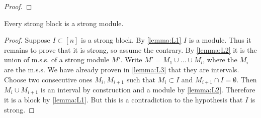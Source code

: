 \documentclass{amsart}
\makeatletter
\theoremstyle{plain}
{
	\newtheorem{{lemma}}{{Lemma}}[section]
	\labelformat{{lemma}}{{Lemma}##}
}
{
	\newtheorem{{theorem}}{{Theorem}}[section]
	\labelformat{{theorem}}{{Theorem}##}
}
{	\@namedef{c@{theorem}}{\@nameuse{c@{lemma}}}}
{
	\newtheorem{{corollary}}{{Corollary}}[section]
	\labelformat{{corollary}}{{Corollary}##}
}
{	\@namedef{c@{corollary}}{\@nameuse{c@{lemma}}}}
{
	\newtheorem{{proposition}}{{Proposition}}[section]
	\labelformat{{proposition}}{{Proposition}##}
}
{	\@namedef{c@{proposition}}{\@nameuse{c@{lemma}}}}
{
	\newtheorem{{algorithm}}{{Construction}}[section]
	\labelformat{{algorithm}}{{Construction}##}
}
{	\@namedef{c@{algorithm}}{\@nameuse{c@{lemma}}}}
\theoremstyle{definition}
{
	\newtheorem{{definition}}{{Definition}}[section]
	\labelformat{{definition}}{{Definition}##}
}
{	\@namedef{c@{definition}}{\@nameuse{c@{lemma}}}}
{
	\newtheorem{{problem}}{{Problem}}[section]
	\labelformat{{problem}}{{Problem}##}
}
{	\@namedef{c@{problem}}{\@nameuse{c@{lemma}}}}
\makeatother
\begin{document}
\begin{proof}
\end{proof}
\begin{lemma}
Every strong block is a strong module.
\end{lemma}
\begin{proof}
	Suppose $I \subset [n]$ is a strong block.
	By \ref{lemma:L1} $I$ is a module.
	Thus it remains to prove that it is strong, so assume the contrary.
	By \ref{lemma:L2} it is the union of m.s.s. of a strong module $M'$. Write $M' = M_1 \cup \ldots \cup M_l$, where the $M_i$ are the m.s.s. We have already proven in \ref{lemma:L3} that they are intervals.
	Choose two consecutive ones $M_i, M_{i+1}$ such that $M_i \subset I$ and $M_{i+1} \cap I = \emptyset$. Then $M_i \cup M_{i+1}$ is an interval by construction and a module by \ref{lemma:L2}.
	Therefore it is a block by \ref{lemma:L1}. But this is a contradiction to the hypothesis that $I$ is strong.
\end{proof}



\end{document}
